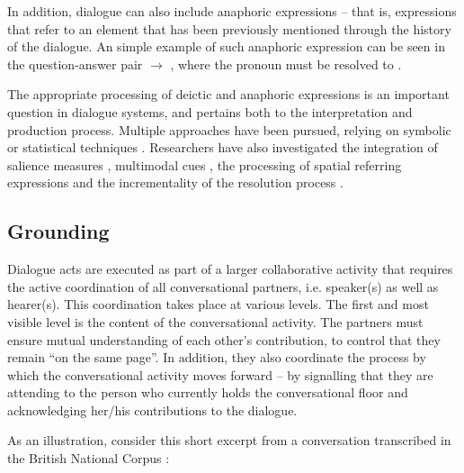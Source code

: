 In addition, dialogue can also include anaphoric expressions -- that is, expressions that refer to an element that has been previously mentioned through the history of the dialogue. An simple example of such anaphoric expression can be seen in the question-answer pair  $\rightarrow$ , where the pronoun  must be resolved to . 

The appropriate processing of deictic and anaphoric expressions is an important question in dialogue systems, and pertains both to the interpretation and production process. Multiple approaches have been pursued, relying on symbolic \citep{Eckert2000} or statistical techniques \citep{StrubeM03,Stent2010}.  Researchers have also investigated the integration of salience measures \citep{Kelleher:2004}, multimodal cues \citep{Frampton:2009,Chen:2011}, the processing of spatial referring expressions \citep{zender/etal:2009-ijcai} and the incrementality of the resolution process \citep{schlangen2009incremental,poesio2011incremental}. 

\subsection{Grounding}

Dialogue acts are executed as part of a larger collaborative activity that requires the active coordination of all conversational partners, i.e. speaker(s) as well as hearer(s).  This coordination takes place at various levels.  The first and most visible level is the content of the conversational activity.   The partners must ensure mutual understanding of each other's contribution, to control that they remain ``on the same page''.  In addition, they  also coordinate the process by which the conversational activity moves forward -- by signalling that they are attending to the person who currently holds the conversational floor and acknowledging her/his contributions to the dialogue.

As an illustration, consider this short excerpt from a conversation transcribed in the British National Corpus \citep{bnc} :

